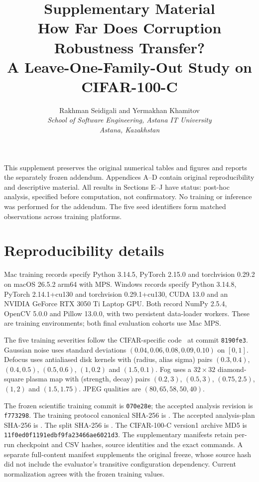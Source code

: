 \documentclass[twoside,a4paper,11pt]{article}
\title{Supplementary Material\\How Far Does Corruption Robustness Transfer?\\A Leave-One-Family-Out Study on CIFAR-100-C}
\author{Rakhman Seidigali and Yermakhan Khamitov\\[1ex]
\small\emph{School of Software Engineering, Astana IT University}\\
\small\emph{Astana, Kazakhstan}}
\date{}
\newif\ifblindreview
\newcommand{\posthoc}{post-hoc analysis, specified before computation, not confirmatory}
\begin{document}
\ifblindreview\maketitleblind\else\maketitle\fi
\pagestyle{plain}\raggedbottom
This supplement preserves the original numerical tables and figures and reports the separately frozen addendum. Appendices A--D contain original reproducibility and descriptive material. All results in Sections E--J have status: \posthoc. No training or inference was performed for the addendum. The five seed identifiers form matched observations across training platforms.
\appendix

\section{Reproducibility details}
\label{app:records}
Mac training records specify Python 3.14.5, PyTorch 2.15.0 and torchvision 0.29.2 on macOS 26.5.2 arm64 with MPS. Windows records specify Python 3.14.8, PyTorch 2.14.1+cu130 and torchvision 0.29.1+cu130, CUDA 13.0 and an NVIDIA GeForce RTX 3050 Ti Laptop GPU. Both record NumPy 2.5.4, OpenCV 5.0.0 and Pillow 13.0.0, with two persistent data-loader workers. These are training environments; both final evaluation cohorts use Mac MPS.

The five training severities follow the CIFAR-specific code~\cite{cifarreference} at commit \texttt{8190fe3}. Gaussian noise uses standard deviations $(0.04,0.06,0.08,0.09,0.10)$ on $[0,1]$. Defocus uses antialiased disk kernels with (radius, alias sigma) pairs $(0.3,0.4)$, $(0.4,0.5)$, $(0.5,0.6)$, $(1,0.2)$ and $(1.5,0.1)$. Fog uses a $32\times32$ diamond-square plasma map with (strength, decay) pairs $(0.2,3)$, $(0.5,3)$, $(0.75,2.5)$, $(1,2)$ and $(1.5,1.75)$. JPEG qualities are $(80,65,58,50,40)$.

The frozen scientific training commit is \texttt{070e28e}; the accepted analysis revision is \texttt{f773298}. The training protocol canonical SHA-256 is . The accepted analysis-plan SHA-256 is . The split SHA-256 is . The CIFAR-100-C version1 archive MD5 is \texttt{11f0ed0f1191edbf9fa23466ae6021d3}. The supplementary manifests retain per-run checkpoint and CSV hashes, source identities and the exact commands. A separate full-content manifest supplements the original freeze, whose source hash did not include the evaluator's transitive configuration dependency. Current normalization agrees with the frozen training values.
\end{document}
